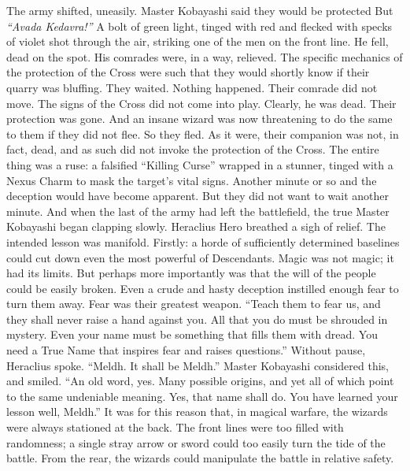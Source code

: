 The army shifted, uneasily. Master Kobayashi said they would be protected{\el} But{\el}
\SmallVSpace
\emph{“Avada Kedavra!”}
\SmallVSpace
A bolt of green light, tinged with red and flecked with specks of violet shot through the air, striking one of the men on the front line. He fell, dead on the spot. His comrades were, in a way, relieved. The specific mechanics of the protection of the Cross were such that they would shortly know if their quarry was bluffing. They waited. Nothing happened. Their comrade did not move. The signs of the Cross did not come into play. Clearly, he was dead. Their protection was gone. And an insane wizard was now threatening to do the same to them if they did not flee.
\SomeVSpace
So they fled.
\SomeVSpace
As it were, their companion was not, in fact, dead, and as such did not invoke the protection of the Cross. The entire thing was a ruse: a falsified “Killing Curse” wrapped in a stunner, tinged with a Nexus Charm to mask the target’s vital signs. Another minute or so and the deception would have become apparent. But they did not want to wait another minute. And when the last of the army had left the battlefield, the true Master Kobayashi began clapping slowly.
\SomeVSpace
Heraclius Hero breathed a sigh of relief.
\SomeVSpace
The intended lesson was manifold. Firstly: a horde of sufficiently determined baselines could cut down even the most powerful of Descendants. Magic was not magic; it had its limits. But perhaps more importantly was that the will of the people could be easily broken. Even a crude and hasty deception instilled enough fear to turn them away. Fear was their greatest weapon.
\SmallVSpace
“Teach them to fear us, and they shall never raise a hand against you. All that you do must be shrouded in mystery. Even your name must be something that fills them with dread. You need a True Name that inspires fear and raises questions.”
\SmallVSpace
Without pause, Heraclius spoke. “Meldh. It shall be Meldh.”
\SmallVSpace
Master Kobayashi considered this, and smiled. “An old word, yes. Many possible origins, and yet all of which point to the same undeniable meaning. Yes, that name shall do. You have learned your lesson well, Meldh.”
\SomeVSpace
It was for this reason that, in magical warfare, the wizards were always stationed at the back. The front lines were too filled with randomness; a single stray arrow or sword could too easily turn the tide of the battle. From the rear, the wizards could manipulate the battle in relative safety.

